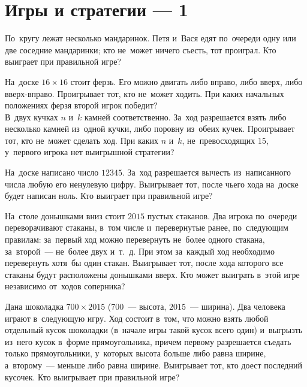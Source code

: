 
\section*{Игры и стратегии --- 1}


\begin{problems}

\item
По~кругу лежат несколько мандаринок.
Петя и~Вася едят по~очереди одну или две соседние мандаринки;
кто не~может ничего съесть, тот проиграл.
Кто выиграет при правильной игре?

\item
\subproblem
На~доске $16 \times 16$ стоит ферзь.
Его можно двигать либо вправо, либо вверх, либо вверх-вправо.
Проигрывает тот, кто не~может ходить.
При каких начальных положениях ферзя второй игрок победит?
\\
\subproblem
В~двух кучках $n$ и~$k$ камней соответственно.
За~ход разрешается взять либо несколько камней из~одной кучки, либо поровну
из~обеих кучек.
Проигрывает тот, кто не~может сделать ход.
При каких $n$ и~$k$, не~превосходящих $15$, у~первого игрока нет выигрышной
стратегии?

\item
На~доске написано число $12345$.
За~ход разрешается вычесть из~написанного числа любую его ненулевую цифру.
Выигрывает тот, после чьего хода на~доске будет написан ноль.
Кто выиграет при правильной игре?

\item
На~столе донышками вниз стоит $2015$ пустых стаканов.
Два игрока по~очереди переворачивают стаканы, в~том числе и~перевернутые ранее,
по~следующим правилам: за~первый ход можно  перевернуть не~более одного
стакана, за~второй~--- не~более двух и~т.~д.
При этом за~каждый ход необходимо перевернуть хотя~бы один стакан.
Выигрывает тот, после хода которого все стаканы будут расположены донышками
вверх.
Кто может выиграть в~этой игре независимо от~ходов соперника?

\item
Дана шоколадка $700 \times 2015$ ($700$~--- высота, $2015$~--- ширина).
Два человека играют в~следующую игру.
Ход состоит в~том, что можно взять любой отдельный кусок шоколадки (в~начале
игры такой кусок всего один) и~выгрызть из~него кусок в~форме прямоугольника,
причем первому разрешается съедать только прямоугольники, у~которых высота
больше либо равна ширине, а~второму~--- меньше либо равна ширине.
Выигрывает тот, кто доест последний кусочек.
Кто выигрывает при правильной игре?


\end{problems}
